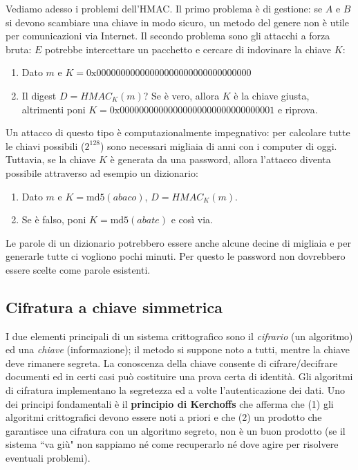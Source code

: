 Vediamo adesso i problemi dell'HMAC. Il primo problema è di gestione: se $A$ e $B$ si devono scambiare una chiave in modo sicuro, un metodo del genere non è utile per comunicazioni via Internet. Il secondo problema sono gli attacchi a forza bruta: $E$ potrebbe intercettare un pacchetto e cercare di indovinare la chiave $K$:
\begin{enumerate}
	\item Dato $m$ e $K=0\text{x}00000000000000000000000000000000$
	\item Il digest $D=HMAC_K(m)$? Se è vero, allora $K$ è la chiave giusta, altrimenti poni $K=0\text{x}00000000000000000000000000000001$ e riprova.
\end{enumerate}
Un attacco di questo tipo è computazionalmente impegnativo: per calcolare tutte le chiavi possibili ($2^{128}$) sono necessari migliaia di anni con i computer di oggi. Tuttavia, se la chiave $K$ è generata da una password, allora l'attacco diventa possibile attraverso ad esempio un dizionario:
\begin{enumerate}
	\item Dato $m$ e $K=\text{md5}(abaco)$, $D=HMAC_K(m)$.
	\item Se è falso, poni $K=\text{md5}(abate)$ e così via.
\end{enumerate}
Le parole di un dizionario potrebbero essere anche alcune decine di migliaia e per generarle tutte ci vogliono pochi minuti. Per questo le password non dovrebbero essere scelte come parole esistenti.

\subsection{Cifratura a chiave simmetrica}
I due elementi principali di un sistema crittografico sono il \textit{cifrario} (un algoritmo) ed una \textit{chiave} (informazione); il metodo si suppone noto a tutti, mentre la chiave deve rimanere segreta. La conoscenza della chiave consente di cifrare/decifrare documenti ed in certi casi può costituire una prova certa di identità. Gli algoritmi di cifratura implementano la segretezza ed a volte l'autenticazione dei dati. Uno dei principi fondamentali è il \textbf{principio di Kerchoffs} che afferma che (1) gli algoritmi crittografici devono essere noti a priori e che (2) un prodotto che garantisce una cifratura con un algoritmo segreto, non è un buon prodotto (se il sistema \textquotedblleft va giù" non sappiamo né come recuperarlo né dove agire per risolvere eventuali problemi).

